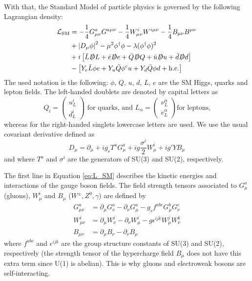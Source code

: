 With that, the Standard Model of particle physics is governed by the following Lagrangian density:
\begin{equation}
\begin{aligned}
    \mathcal{L}_{\text{SM}} &= -\frac{1}{4}G_{\mu\nu}^{a}G^{a\mu\nu} -\frac{1}{4}W_{\mu\nu}^{i}W^{i\mu\nu} -\frac{1}{4}B_{\mu\nu}B^{\mu\nu} \label{eq:L_SM}\\
    &+ \left\lvert D_\mu\phi\right\rvert^2 - \mu^2\phi^\dag\phi - \lambda(\phi^\dag\phi)^2 \\
    &+ i\left[\bar{L}\slashed{D} L + \bar{e}\slashed{D} e + \bar{Q}\slashed{D} Q + \bar{u}\slashed{D} u + \bar{d}\slashed{D} d\right] \\
    & -\left[Y_{e}\bar{L}\phi e + Y_u\bar{Q}\phi^{c} u + Y_d\bar{Q}\phi d + \text{h.c.}\right]
\end{aligned}
\end{equation}
The used notation is the following: $\phi$, $Q$, $u$, $d$, $L$, $e$ are the SM Higgs, quarks and lepton fields. The left-handed doublets are denoted by capital letters as
\begin{equation*}
    Q_{i} = 
    \begin{pmatrix}
    u_{L}^{i}\\
    d_{L}^{i}
    \end{pmatrix}
    \text{ for quarks, and } L_{\alpha} = 
    \begin{pmatrix}
    \nu_{L}^{\alpha}\\
    e_{L}^{\alpha}
    \end{pmatrix}\text{for leptons,}
\end{equation*}
whereas for the right-handed singlets lowercase letters are used. We use the usual covariant derivative defined as
\begin{equation*}
    D_\mu = \partial_\mu + ig_{s}T^{a}G_\mu^{a} + ig\frac{\sigma^{i}}{2}W_\mu^{i} + ig'YB_\mu
\end{equation*}
and where $T^{a}$ and $\sigma^{i}$ are the generators of SU(3) and SU(2), respectively. 

The first line in Equation \eqref{eq:L_SM} describes the kinetic energies and interactions of the gauge boson fields. The field strength tensors associated to $G_\mu^{a}$ (gluons), $W_\mu^{i}$ and $B_\mu$ ($W^{\pm}, Z^{0}, \gamma$) are defined by
\begin{align*}
    G_{\mu\nu}^{a} &= \partial_\mu G_\nu^{a} - \partial_\nu G_\mu^{a} - g_{s} f^{abc}G_\mu^{b}G_\nu^{c}\\
    W_{\mu\nu}^{i} &= \partial_\mu W_\nu^{i} - \partial_\nu W_\mu^{i} - g \epsilon^{ijk}W_\mu^{j}W_\nu^{k}\\
    B_{\mu\nu} &= \partial_\mu B_\nu - \partial_\nu B_\mu
\end{align*}
where $f^{abc}$ and $\epsilon^{ijk}$ are the group structure constants of SU(3) and SU(2), respectively (the strength tensor of the hypercharge field $B_\mu$ does not have this extra term since U(1) is abelian). This is why gluons and electroweak bosons are self-interacting.

